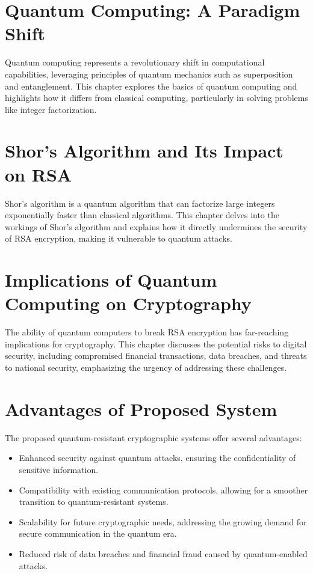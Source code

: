 \documentclass[12pt,a4paper]{report}
\begin{document}
\chapter{Quantum Computing: A Paradigm Shift}
Quantum computing represents a revolutionary shift in computational capabilities, leveraging principles of quantum mechanics such as superposition and entanglement. This chapter explores the basics of quantum computing and highlights how it differs from classical computing, particularly in solving problems like integer factorization.

\chapter{Shor's Algorithm and Its Impact on RSA}
Shor's algorithm is a quantum algorithm that can factorize large integers exponentially faster than classical algorithms. This chapter delves into the workings of Shor's algorithm and explains how it directly undermines the security of RSA encryption, making it vulnerable to quantum attacks.

\chapter{Implications of Quantum Computing on Cryptography}
The ability of quantum computers to break RSA encryption has far-reaching implications for cryptography. This chapter discusses the potential risks to digital security, including compromised financial transactions, data breaches, and threats to national security, emphasizing the urgency of addressing these challenges.

\chapter{Advantages of Proposed System}
The proposed quantum-resistant cryptographic systems offer several advantages:
\begin{itemize}
    \item Enhanced security against quantum attacks, ensuring the confidentiality of sensitive information.
    \item Compatibility with existing communication protocols, allowing for a smoother transition to quantum-resistant systems.
    \item Scalability for future cryptographic needs, addressing the growing demand for secure communication in the quantum era.
    \item Reduced risk of data breaches and financial fraud caused by quantum-enabled attacks.
\end{itemize}
\end{document}
